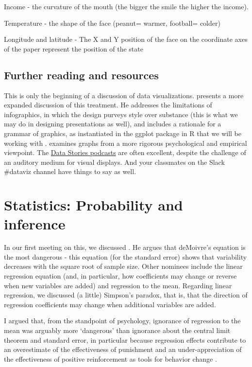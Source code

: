\documentclass[]{book}
\theoremstyle{definition}
\theoremstyle{definition}
\theoremstyle{definition}
\theoremstyle{remark}
\begin{document}
Income - the curvature of the mouth (the bigger the smile the higher the
income).

Temperature - the shape of the face (peanut= warmer, football= colder)

Longitude and latitude - The X and Y position of the face on the
coordinate axes of the paper represent the position of the state

\section{Further reading and
resources}\label{further-reading-and-resources}

This is only the beginning of a discussion of data visualizations.
\citet{healy2018viz} presents a more expanded discussion of this
treatment. He addresses the limitations of infographics, in which the
design purveys style over substance (this is what we may do in designing
presentations as well), and includes a rationale for a grammar of
graphics, as instantiated in the ggplot package in R that we will be
working with \citep{wickham2016r}. \citet{cleveland1985graphical}
examines graphs from a more rigorous psychological and empirical
viewpoint. The \href{http://datastori.es/}{Data Stories podcasts} are
often excellent, despite the challenge of an auditory medium for visual
displays. And your classmates on the Slack \#dataviz channel have things
to say as well.

\chapter{Statistics: Probability and
inference}\label{statistics-probability-and-inference}

In our first meeting on this, we discussed \citet{wainer2007most}. He
argues that deMoivre's equation is the most dangerous - this equation
(for the standard error) shows that variability decreases with the
square root of sample size. Other nominees include the linear regression
equation (and, in particular, how coefficients may change or reverse
when new variables are added) and regression to the mean. Regarding
linear regression, we discussed (a little) Simpson's paradox, that is,
that the direction of regression coefficients may change when additional
variables are added.

I argued that, from the standpoint of psychology, ignorance of
regression to the mean was arguably more `dangerous' than ignorance
about the central limit theorem and standard error, in particular
because regression effects contribute to an overestimate of the
effectiveness of punishment and an under-appreciation of the
effectiveness of positive reinforcement as tools for behavior change
\citep{hastie2010rational}.
\end{document}
